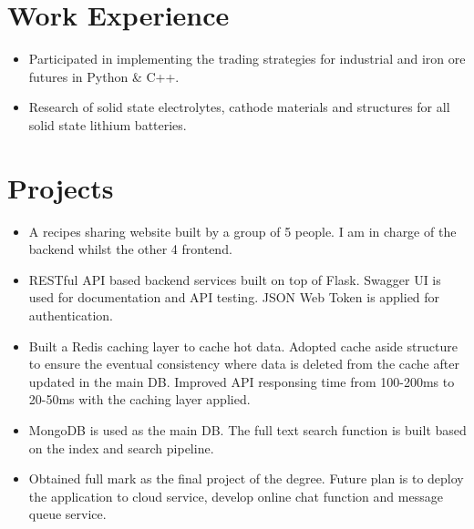 \documentclass{resume}
\begin{document}

\section{Work Experience}
\begin{itemize}
  \item Participated in implementing the trading strategies for industrial and iron ore futures in Python \& C++.
\end{itemize}

\begin{itemize}
  \item Research of solid state electrolytes, cathode materials and structures for all solid state lithium batteries.
\end{itemize}


\section{Projects}

\begin{itemize}
  \item A recipes sharing website built by a group of 5 people. I am in charge of the backend whilst the other 4 frontend.
  \item RESTful API based backend services built on top of Flask. Swagger UI is used for documentation and API testing. JSON Web Token is applied for authentication.
  \item Built a Redis caching layer to cache hot data. Adopted cache aside structure to ensure the eventual consistency where data is deleted from the cache after updated in the main DB. Improved API responsing time from 100-200ms to 20-50ms with the caching layer applied.
  \item MongoDB is used as the main DB. The full text search function is built based on the index and search pipeline.
  \item Obtained full mark as the final project of the degree. Future plan is to deploy the application to cloud service, develop online chat function and message queue service.
\end{itemize}
\end{document}

